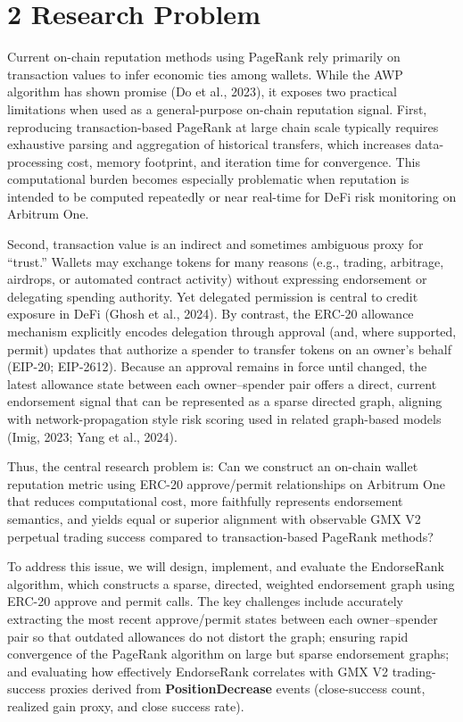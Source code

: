 \clearpage
{}
\section*{2 \textbf{Research Problem}}
\label{sec:research-problem}

Current on-chain reputation methods using PageRank rely primarily on transaction values to infer economic ties among wallets. While the AWP algorithm has shown promise (Do et al., 2023), it exposes two practical limitations when used as a general-purpose on-chain reputation signal. First, reproducing transaction-based PageRank at large chain scale typically requires exhaustive parsing and aggregation of historical transfers, which increases data-processing cost, memory footprint, and iteration time for convergence. This computational burden becomes especially problematic when reputation is intended to be computed repeatedly or near real-time for DeFi risk monitoring on Arbitrum One.


Second, transaction value is an indirect and sometimes ambiguous proxy for ``trust.'' Wallets may exchange tokens for many reasons (e.g., trading, arbitrage, airdrops, or automated contract activity) without expressing endorsement or delegating spending authority. Yet delegated permission is central to credit exposure in DeFi (Ghosh et al., 2024). By contrast, the ERC-20 allowance mechanism explicitly encodes delegation through approval (and, where supported, permit) updates that authorize a spender to transfer tokens on an owner's behalf (EIP-20; EIP-2612). Because an approval remains in force until changed, the latest allowance state between each owner--spender pair offers a direct, current endorsement signal that can be represented as a sparse directed graph, aligning with network-propagation style risk scoring used in related graph-based models (Imig, 2023; Yang et al., 2024).


Thus, the central research problem is: Can we construct an on-chain wallet reputation metric using ERC-20 approve/permit relationships on Arbitrum One that reduces computational cost, more faithfully represents endorsement semantics, and yields equal or superior alignment with observable GMX V2 perpetual trading success compared to transaction-based PageRank methods?


To address this issue, we will design, implement, and evaluate the EndorseRank algorithm, which constructs a sparse, directed, weighted endorsement graph using ERC-20 approve and permit calls. The key challenges include accurately extracting the most recent approve/permit states between each owner--spender pair so that outdated allowances do not distort the graph; ensuring rapid convergence of the PageRank algorithm on large but sparse endorsement graphs; and evaluating how effectively EndorseRank correlates with GMX V2 trading-success proxies derived from \textbf{PositionDecrease} events (close-success count, realized gain proxy, and close success rate).


